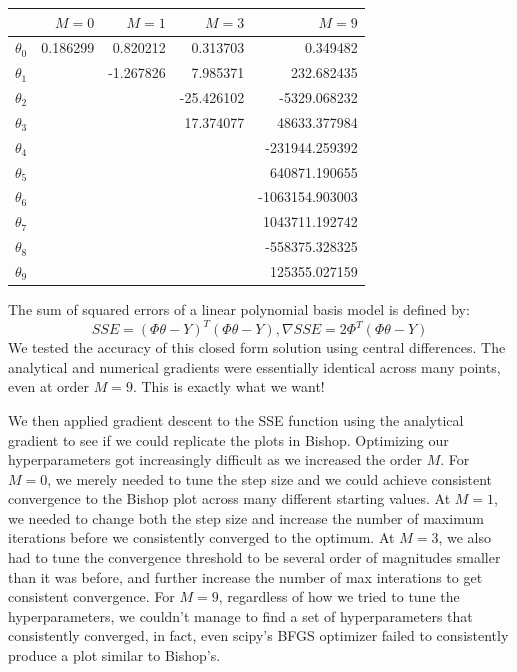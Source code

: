 \documentclass[10pt]{article}
\begin{document}
\begin{table}[ht]
\centering
{}
\begin{tabular}{lrrrr}
\toprule
{} &     $M=0$ &     $M=1$ &      $M=3$ &           $M=9$ \\
\midrule
$\theta_0$ &  0.186299 &  0.820212 &   0.313703 &        0.349482 \\
$\theta_1$ &        & -1.267826 &   7.985371 &      232.682435 \\
$\theta_2$ &        &        & -25.426102 &    -5329.068232 \\
$\theta_3$ &        &        &  17.374077 &    48633.377984 \\
$\theta_4$ &        &        &         &  -231944.259392 \\
$\theta_5$ &        &        &         &   640871.190655 \\
$\theta_6$ &        &        &         & -1063154.903003 \\
$\theta_7$ &        &        &         &  1043711.192742 \\
$\theta_8$ &        &        &         &  -558375.328325 \\
$\theta_9$ &        &        &         &   125355.027159 \\
\bottomrule
\end{tabular}
\end{table}

The sum of squared errors of a linear polynomial basis model is defined by: 
\begin{equation*}
	SSE=(\Phi \theta-Y)^T(\Phi \theta-Y),         	\nabla SSE = 2\Phi^T(\Phi \theta-Y)
\end{equation*}
We tested the accuracy of this closed form solution using central differences. The analytical and numerical gradients were essentially identical across many points, even at order $M=9$. This is exactly what we want!

We then applied gradient descent to the SSE function using the analytical gradient to see if we could replicate the plots in Bishop. Optimizing our hyperparameters got increasingly difficult as we increased the order $M$. For $M=0$, we merely needed to tune the step size and we could achieve consistent convergence to the Bishop plot across many different starting values. At $M=1$, we needed to change both the step size and increase the number of maximum iterations before we consistently converged to the optimum. At $M=3$, we also had to tune the convergence threshold to be several order of magnitudes smaller than it was before, and further increase the number of max interations to get consistent convergence. For $M=9$, regardless of how we tried to tune the hyperparameters, we couldn't manage to find a set of hyperparameters that consistently converged, in fact, even scipy's BFGS optimizer failed to consistently produce a plot similar to Bishop's.
\end{document}
